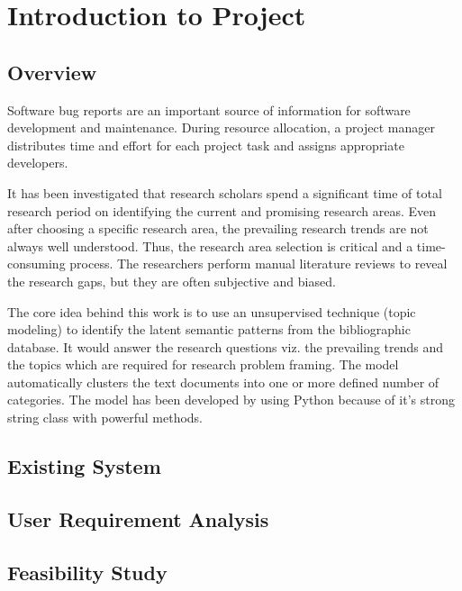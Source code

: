 \chapter{Introduction to Project}
\label{chap:itp}

\section{Overview}
Software bug reports are an important source of information for software development and maintenance. During	resource allocation, a project manager distributes time and effort for each project task and assigns appropriate developers. 

It has been investigated that research scholars spend a significant time of total research period on identifying the current and promising research areas. Even after choosing a specific research area, the prevailing research trends are not always well understood. Thus, the research area selection is critical and a time-consuming process. The researchers perform manual literature reviews to reveal the research gaps, but they are often subjective and biased. 

The core idea behind this work is to use an unsupervised technique (topic modeling) to identify the latent semantic patterns from the bibliographic database. It would answer the research questions viz. the prevailing trends and the topics which are required for research problem framing. The model automatically clusters the text documents into one or more defined number of categories. The model has been developed by using Python because of it's strong string class with powerful methods.
\section{Existing System}
\section{User Requirement Analysis}
 \section{Feasibility Study}
 

